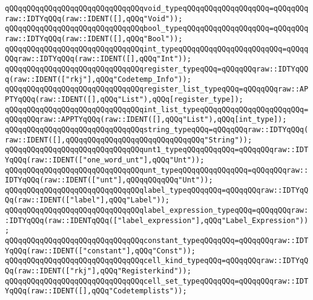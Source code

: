 \verb|qQQqqQQqqQQqqQQqqQQqqQQqqQQqqQQqvoid_typeqQQqqQQqqQQqqQQqqQQq=qQQqqQQqraw::IDTYqQQq(raw::IDENT([],qQQq"Void"));|\newline
\verb|qQQqqQQqqQQqqQQqqQQqqQQqqQQqqQQqbool_typeqQQqqQQqqQQqqQQqqQQq=qQQqqQQqraw::IDTYqQQq(raw::IDENT([],qQQq"Bool"));|\newline
\verb|qQQqqQQqqQQqqQQqqQQqqQQqqQQqqQQqint_typeqQQqqQQqqQQqqQQqqQQqqQQq=qQQqqQQqraw::IDTYqQQq(raw::IDENT([],qQQq"Int"));|\newline
\verb|qQQqqQQqqQQqqQQqqQQqqQQqqQQqqQQqregister_typeqQQq=qQQqqQQqraw::IDTYqQQq(raw::IDENT(["rkj"],qQQq"Codetemp_Info"));|\newline
\newline
\verb|qQQqqQQqqQQqqQQqqQQqqQQqqQQqqQQqregister_list_typeqQQq=qQQqqQQqraw::APPTYqQQq(raw::IDENT([],qQQq"List"),qQQq[register_type]);|\newline
\verb|qQQqqQQqqQQqqQQqqQQqqQQqqQQqqQQqint_list_typeqQQqqQQqqQQqqQQqqQQqqQQq=qQQqqQQqraw::APPTYqQQq(raw::IDENT([],qQQq"List"),qQQq[int_type]);|\newline
\newline
\verb|qQQqqQQqqQQqqQQqqQQqqQQqqQQqqQQqstring_typeqQQq=qQQqqQQqraw::IDTYqQQq(raw::IDENT([],qQQqqQQqqQQqqQQqqQQqqQQqqQQqqQQq"String"));|\newline
\verb|qQQqqQQqqQQqqQQqqQQqqQQqqQQqqQQqunt1_typeqQQqqQQqqQQq=qQQqqQQqraw::IDTYqQQq(raw::IDENT(["one_word_unt"],qQQq"Unt"));|\newline
\verb|qQQqqQQqqQQqqQQqqQQqqQQqqQQqqQQqunt_typeqQQqqQQqqQQqqQQq=qQQqqQQqraw::IDTYqQQq(raw::IDENT(["unt"],qQQqqQQqqQQq"Unt"));|\newline
\verb|qQQqqQQqqQQqqQQqqQQqqQQqqQQqqQQqlabel_typeqQQqqQQq=qQQqqQQqraw::IDTYqQQq(raw::IDENT(["label"],qQQq"Label"));|\newline
\newline
\verb|qQQqqQQqqQQqqQQqqQQqqQQqqQQqqQQqlabel_expression_typeqQQq=qQQqqQQqraw::IDTYqQQq(raw::IDENTqQQq(["label_expression"],qQQq"Label_Expression"));|\newline
\newline
\verb|qQQqqQQqqQQqqQQqqQQqqQQqqQQqqQQqconstant_typeqQQqqQQq=qQQqqQQqraw::IDTYqQQq(raw::IDENT(["constant"],qQQq"Const"));|\newline
\verb|qQQqqQQqqQQqqQQqqQQqqQQqqQQqqQQqcell_kind_typeqQQq=qQQqqQQqraw::IDTYqQQq(raw::IDENT(["rkj"],qQQq"Registerkind"));|\newline
\verb|qQQqqQQqqQQqqQQqqQQqqQQqqQQqqQQqcell_set_typeqQQqqQQq=qQQqqQQqraw::IDTYqQQq(raw::IDENT([],qQQq"Codetemplists"));|\newline
